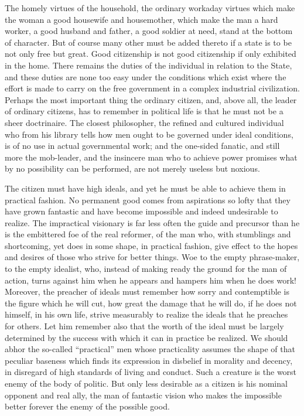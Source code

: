 \documentclass[a4paper]{amsbook}
\begin{document}
The homely virtues of the household, the ordinary workaday virtues which make the woman a good housewife and housemother, which make the man a hard worker, a good husband and father, a good soldier at need, stand at the bottom of character. But of course many other must be added thereto if a state is to be not only free but great. Good citizenship is not good citizenship if only exhibited in the home. There remains the duties of the individual in relation to the State, and these duties are none too easy under the conditions which exist where the effort is made to carry on the free government in a complex industrial civilization. Perhaps the most important thing the ordinary citizen, and, above all, the leader of ordinary citizens, has to remember in political life is that he must not be a sheer doctrinaire. The closest philosopher, the refined and cultured individual who from his library tells how men ought to be governed under ideal conditions, is of no use in actual governmental work; and the one-sided fanatic, and still more the mob-leader, and the insincere man who to achieve power promises what by no possibility can be performed, are not merely useless but noxious.

The citizen must have high ideals, and yet he must be able to achieve them in practical fashion. No permanent good comes from aspirations so lofty that they have grown fantastic and have become impossible and indeed undesirable to realize. The impractical visionary is far less often the guide and precursor than he is the embittered foe of the real reformer, of the man who, with stumblings and shortcoming, yet does in some shape, in practical fashion, give effect to the hopes and desires of those who strive for better things. Woe to the empty phrase-maker, to the empty idealist, who, instead of making ready the ground for the man of action, turns against him when he appears and hampers him when he does work! Moreover, the preacher of ideals must remember how sorry and contemptible is the figure which he will cut, how great the damage that he will do, if he does not himself, in his own life, strive measurably to realize the ideals that he preaches for others. Let him remember also that the worth of the ideal must be largely determined by the success with which it can in practice be realized. We should abhor the so-called “practical” men whose practicality assumes the shape of that peculiar baseness which finds its expression in disbelief in morality and decency, in disregard of high standards of living and conduct. Such a creature is the worst enemy of the body of politic. But only less desirable as a citizen is his nominal opponent and real ally, the man of fantastic vision who makes the impossible better forever the enemy of the possible good.
\end{document}
